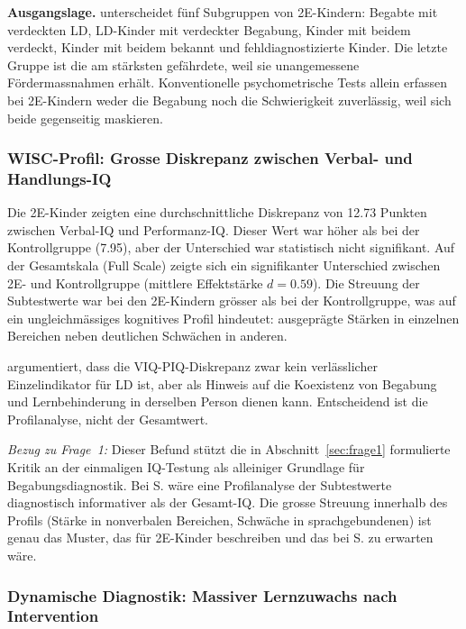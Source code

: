 \documentclass[ngerman, a4paper]{article}
\begin{document}
\textbf{Ausgangslage.} \textcite{alhroub2021utility} unterscheidet fünf Subgruppen von
2E-Kindern: Begabte mit verdeckten LD, LD-Kinder mit verdeckter Begabung,
Kinder mit beidem verdeckt, Kinder mit beidem bekannt und
fehldiagnostizierte Kinder. Die letzte Gruppe ist die am stärksten
gefährdete, weil sie unangemessene Fördermassnahmen erhält. Konventionelle
psychometrische Tests allein erfassen bei 2E-Kindern weder die Begabung
noch die Schwierigkeit zuverlässig, weil sich beide gegenseitig maskieren.

\subsubsection*{WISC-Profil: Grosse Diskrepanz zwischen Verbal- und
  Handlungs-IQ}

Die 2E-Kinder zeigten eine durchschnittliche Diskrepanz von 12.73 Punkten
zwischen Verbal-IQ und Performanz-IQ. Dieser Wert war höher als bei der
Kontrollgruppe (7.95), aber der Unterschied war statistisch nicht
signifikant. Auf der Gesamtskala (Full Scale) zeigte sich ein
signifikanter Unterschied zwischen 2E- und Kontrollgruppe (mittlere
Effektstärke $d = 0.59$). Die Streuung der Subtestwerte war bei den
2E-Kindern grösser als bei der Kontrollgruppe, was auf ein
ungleichmässiges kognitives Profil hindeutet: ausgeprägte Stärken in
einzelnen Bereichen neben deutlichen Schwächen in anderen.

\textcite{alhroub2021utility} argumentiert, dass die VIQ-PIQ-Diskrepanz zwar kein verlässlicher
Einzelindikator für LD ist, aber als Hinweis auf die Koexistenz von
Begabung und Lernbehinderung in derselben Person dienen kann. Entscheidend
ist die Profilanalyse, nicht der Gesamtwert.

\textit{Bezug zu Frage~1:} Dieser Befund stützt die in
Abschnitt~\ref{sec:frage1} formulierte Kritik an der einmaligen
IQ-Testung als alleiniger Grundlage für Begabungsdiagnostik. Bei S. wäre
eine Profilanalyse der Subtestwerte diagnostisch informativer als der
Gesamt-IQ. Die grosse Streuung innerhalb des Profils (Stärke in
nonverbalen Bereichen, Schwäche in sprachgebundenen) ist genau das Muster,
das \textcite[Kap.\,2.2]{preckel2013hochbegabung} für 2E-Kinder beschreiben und das
bei S. zu erwarten wäre.

\subsubsection*{Dynamische Diagnostik: Massiver Lernzuwachs nach
  Intervention}
\end{document}
